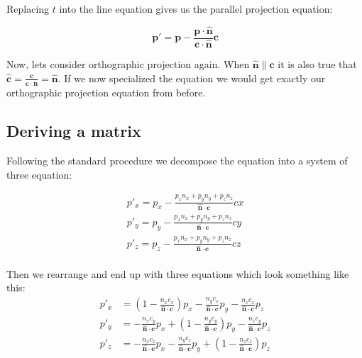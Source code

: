 \documentclass[]{report}   %
\begin{document}
Replacing \(t\) into the line equation gives us the parallel projection equation:
\begin{mdframed}
\[
	\mathbf{p\prime} = \mathbf{p} - \frac{\mathbf{p} \cdot \mathbf{\hat{n}}}{\mathbf{c} \cdot \mathbf{\hat{n}}} 
	\mathbf{c}
\]
\end{mdframed}


Now, lets consider orthographic projection again. When \(\mathbf{\hat{n}} \parallel \mathbf{c}\) it is also true that \(\mathbf{\hat{c}} = \frac{\mathbf{c}}{\mathbf{c} \cdot \mathbf{\hat{n}}} = \mathbf{\hat{n}}\). If we now specialized the equation we would get exactly our orthographic projection equation from before.


\subsection{Deriving a matrix}

Following the standard procedure we decompose the equation into a system of three equation:

\begin{align*}
	p\prime_x = p_x - \frac	{p_x n_x + p_y n_y + p_z n_z}
							{\mathbf{\hat{n}}\cdot\mathbf{c}} cx	\\
	p\prime_y = p_y - \frac	{p_x n_x + p_y n_y + p_z n_z}
							{\mathbf{\hat{n}}\cdot\mathbf{c}} cy	\\
	p\prime_z = p_z - \frac	{p_x n_x + p_y n_y + p_z n_z}
							{\mathbf{\hat{n}}\cdot\mathbf{c}} cz	\\
\end{align*}

Then we rearrange and end up with three equations which look something like this:
\begin{align*}
	p\prime_x &=(1 - \frac{n_x c_x}{\mathbf{\hat{n}}\cdot\mathbf{c}}) p_x 
				   - \frac{n_y c_x}{\mathbf{\hat{n}}\cdot\mathbf{c}}  p_y
				   - \frac{n_z c_x}{\mathbf{\hat{n}}\cdot\mathbf{c}}  p_z
				\\
	p\prime_y &= - \frac{n_x c_y}{\mathbf{\hat{n}}\cdot\mathbf{c}}	p_x
			+(1 - \frac{n_y c_y}{\mathbf{\hat{n}}\cdot\mathbf{c}})	p_y
				 - \frac{n_z c_y}{\mathbf{\hat{n}}\cdot\mathbf{c}}	p_z
				\\
	p\prime_z &= - \frac{n_x c_z}{\mathbf{\hat{n}}\cdot\mathbf{c}}	p_x
				 - \frac{n_y c_z}{\mathbf{\hat{n}}\cdot\mathbf{c}}	p_y
			+(1 - \frac{n_z c_z}{\mathbf{\hat{n}}\cdot\mathbf{c}})	p_z
\end{align*}
\end{document}
